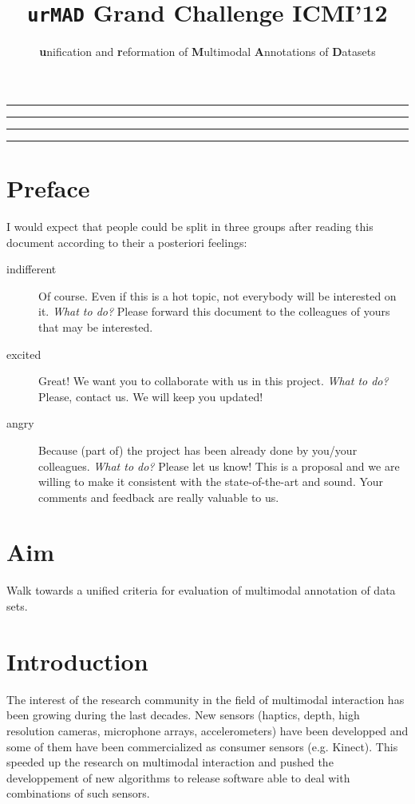 \documentclass{article}
\title{\texttt{urMAD}\hspace{0.5cm} Grand Challenge ICMI'12}
\author{\textbf{u}nification and \textbf{r}eformation of
 \textbf{M}ultimodal \textbf{A}nnotations of \textbf{D}atasets}
\date{}
\begin{document}
 \maketitle
 \hrule
 \vspace{0.1cm}
 \hrule
 \tableofcontents
 \vspace{0.5cm}
 \hrule
 \vspace{0.1cm}
 \hrule

 \section{Preface}
 \label{sec:preface}
I would expect that people could be split in three groups after reading this document according to their a posteriori
feelings:
\begin{description}
 \item [indifferent] Of course. Even if this is a hot topic, not everybody will be interested on it. \textit{What to
do?} Please forward this document to the colleagues of yours that may be interested.
 \item [excited] Great! We want you to collaborate with us in this project. \textit{What to do?} Please, contact us. We
will keep you updated!
 \item [angry] Because (part of) the project has been already done by you/your colleagues. \textit{What to do?} Please
let us know! This is a proposal and we are willing to make it consistent with the state-of-the-art and sound. Your
comments and feedback are really valuable to us.
\end{description}


 \section{Aim}
Walk towards a unified criteria for evaluation of multimodal annotation of data sets.

 \section{Introduction}
 The interest of the research community in the field of multimodal interaction has been growing during the last decades.
New sensors (haptics, depth, high resolution cameras, microphone arrays, accelerometers) have been developped and some
of them have been commercialized as consumer sensors (e.g. Kinect). This speeded up the research on multimodal
interaction and pushed the developpement of new algorithms to release software able to deal with combinations of such
sensors.
\end{document}
